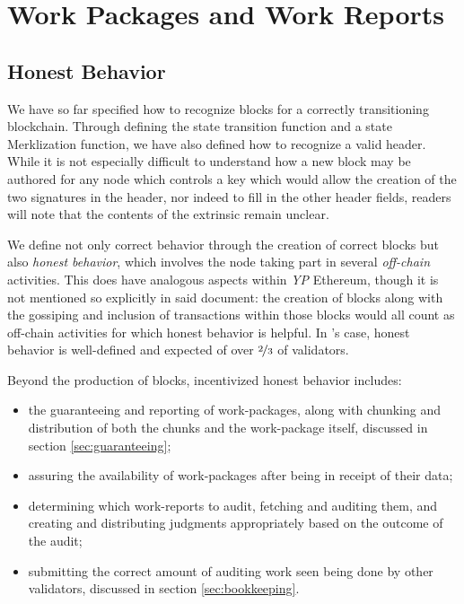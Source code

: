\section{Work Packages and Work Reports}\label{sec:workpackagesandworkreports}

\newcommand*{\newavailabilityspecifier}{A}
\newcommand*{\itemtodigest}{C}
\newcommand*{\countupexports}{I}
\newcommand*{\importsegmentdata}{S}
\newcommand*{\justifysegmentdata}{J}
\newcommand*{\segrootlookup}{L}
\newcommand*{\pagedproofs}{P}
\newcommand*{\marshallrefine}{R}
\newcommand*{\extrinsicdata}{X}
\newcommand*{\segsX}{\mathbf{b}}
\newcommand*{\allexports}{\overline{\mathbf{e}}}

\subsection{Honest Behavior}

We have so far specified how to recognize blocks for a correctly transitioning \Jam blockchain. Through defining the state transition function and a state Merklization function, we have also defined how to recognize a valid header. While it is not especially difficult to understand how a new block may be authored for any node which controls a key which would allow the creation of the two signatures in the header, nor indeed to fill in the other header fields, readers will note that the contents of the extrinsic remain unclear.

We define not only correct behavior through the creation of correct blocks but also \emph{honest behavior}, which involves the node taking part in several \emph{off-chain} activities. This does have analogous aspects within \emph{YP} Ethereum, though it is not mentioned so explicitly in said document: the creation of blocks along with the gossiping and inclusion of transactions within those blocks would all count as off-chain activities for which honest behavior is helpful. In \Jam's case, honest behavior is well-defined and expected of over $\nicefrac{2}{3}$ of validators.

Beyond the production of blocks, incentivized honest behavior includes:
\begin{itemize}
    \item the guaranteeing and reporting of work-packages, along with chunking and distribution of both the chunks and the work-package itself, discussed in section \ref{sec:guaranteeing};
    \item assuring the availability of work-packages after being in receipt of their data;
    \item determining which work-reports to audit, fetching and auditing them, and creating and distributing judgments appropriately based on the outcome of the audit;
    \item submitting the correct amount of auditing work seen being done by other validators, discussed in section \ref{sec:bookkeeping}.
\end{itemize}

